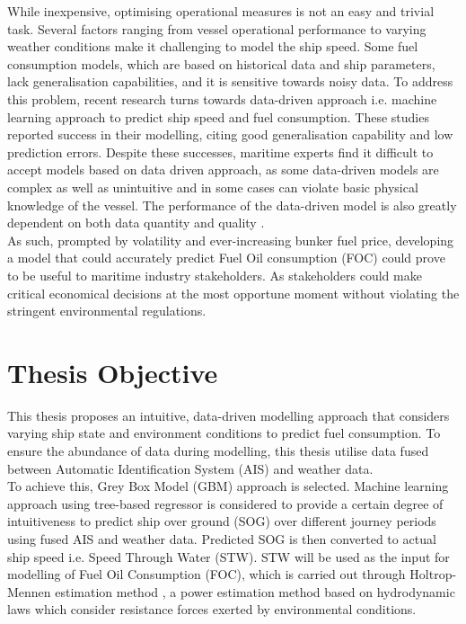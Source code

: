 While inexpensive, optimising operational measures is not an easy and trivial task. Several factors ranging from vessel operational performance to varying weather conditions make it challenging to model the ship speed. Some fuel consumption models, which are based on historical data and ship parameters, lack generalisation capabilities, and it is sensitive towards noisy data. To address this problem, recent research turns towards data-driven approach i.e. machine learning approach to predict ship speed and fuel consumption. These studies reported success in their modelling, citing good generalisation capability and low prediction errors. Despite these successes, maritime experts find it difficult to accept models based on data driven approach, as some data-driven models are complex as well as unintuitive and in some cases can violate basic physical knowledge of the vessel. The performance of the data-driven model is also greatly dependent on both data quantity and quality .\\      

As such, prompted by volatility and ever-increasing bunker fuel price, developing a model that could accurately predict Fuel Oil consumption (FOC) could prove to be useful to maritime industry stakeholders. As stakeholders could make critical economical decisions at the most opportune moment without violating the stringent environmental regulations. \\

\section{Thesis Objective}\label{sec:objectives}

This thesis proposes an intuitive, data-driven modelling approach that considers varying ship state and environment conditions to predict fuel consumption. To ensure the abundance of data during modelling, this thesis utilise data fused between Automatic Identification System (AIS) and weather data.\\

To achieve this, Grey Box Model (GBM) approach is selected. Machine learning approach using tree-based regressor is considered to provide a certain degree of intuitiveness to predict ship over ground (SOG) over different journey periods using fused AIS and weather data. Predicted SOG is then converted to actual ship speed i.e. Speed Through Water (STW). STW will be used as the input for modelling of Fuel Oil Consumption (FOC), which is carried out through Holtrop-Mennen estimation method , a power estimation method based on hydrodynamic laws which consider resistance forces exerted by environmental conditions.\\

